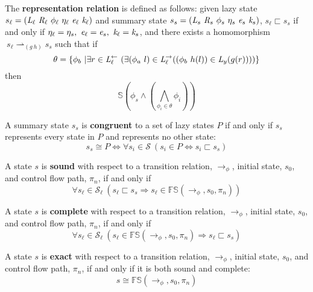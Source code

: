 \begin{definition}
\label{representation}
The \textbf{representation relation} is defined as follows: given lazy state $s_\ell = ( \cfgnt{L}_\ell\ \cfgnt{R}_\ell\ \phi_\ell\ \eta_\ell\ \cfgnt{e}_\ell\ \cfgnt{k}_\ell )$ and summary state $s_s = ( \emph{L}_s\ \emph{R}_s\ \phi_s\ \eta_s\ \emph{e}_s\ \emph{k}_s )$, $s_\ell \sqsubset s_s $ if and only if $\eta_{\ell} = \eta_{s} ,\ \cfgnt{e}_{\ell} = \cfgnt{e}_{s} ,\ \cfgnt{k}_{\ell} = \cfgnt{k}_{s}$, and there exists a homomorphism $\ s_\ell \rightharpoonup_{(g\ h)} s_s $ such that if 
$$\theta = \{ \phi_b\ | \exists r \in \emph{L}_\ell^\leftarrow\ (\exists (\phi_a\ l) \in \emph{L}_\ell^\rightarrow ( (\phi_b\ h(l)) \in \emph{L}_y (g(r))))  \}$$ then 
\begin{equation}
\label{eqn:valid}
 \mathbb{S}( \phi_s \wedge (\bigwedge_{\phi_i \in \theta} \phi_i)) 
\end{equation}
\end{definition}

\begin{definition}
\label{congruent}
A summary state $s_s$ is \textbf{congruent} to a set of lazy states $P$ if and only if $s_s$ represents every state in $P$ and represents no other state: 
$$s_s \cong P \Leftrightarrow \forall s_i \in \mathcal{S}\ (s_i \in P \Leftrightarrow s_i \sqsubset s_s) $$
\end{definition}

\begin{definition}
\label{sound}
A state $s$ is \textbf{sound} with respect to a transition relation, $\rightarrow_\phi$, initial state, $s_0$, and control flow path, $\pi_n$, if and only if 
$$ \forall s_\ell \in \mathcal{S}_\ell\ (s_\ell \sqsubset s_s \Rightarrow s_\ell \in \mathbb{FS}(\rightarrow_{\phi},s_0,\pi_n) ) $$
\end{definition}

\begin{definition}
\label{complete}
A state $s$ is \textbf{complete} with respect to a transition relation, $\rightarrow_\phi$, initial state, $s_0$, and control flow path, $\pi_n$, if and only if 
$$ \forall s_\ell \in \mathcal{S}_\ell\ ( s_\ell \in \mathbb{FS}(\rightarrow_{\phi},s_0,\pi_n)\Rightarrow s_\ell \sqsubset s_s ) $$
\end{definition}

\begin{definition}
\label{exact}
A state $s$ is \textbf{exact} with respect to a transition relation, $\rightarrow_\phi$, initial state, $s_0$, and control flow path, $\pi_n$, if and only if it is both sound and complete:
$$ s \cong \mathbb{FS}(\rightarrow_{\phi},s_0,\pi_n)$$
\end{definition}

